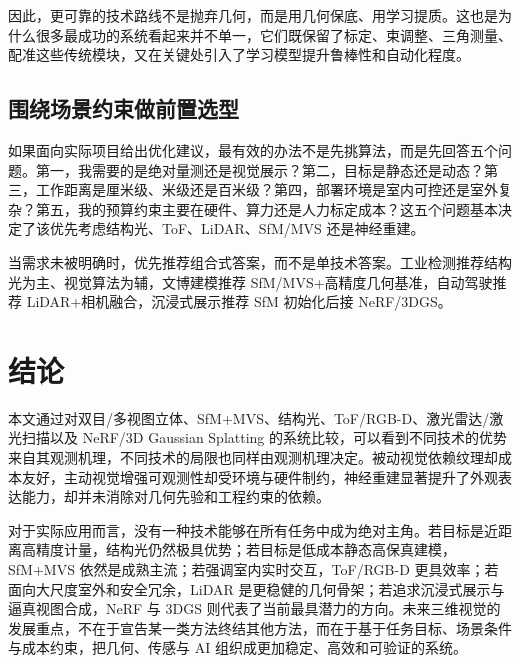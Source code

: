 \documentclass[12pt,a4paper]{ctexart}
\begin{document}
因此，更可靠的技术路线不是抛弃几何，而是用几何保底、用学习提质。这也是为什么很多最成功的系统看起来并不单一，它们既保留了标定、束调整、三角测量、配准这些传统模块，又在关键处引入了学习模型提升鲁棒性和自动化程度。

\subsection{围绕场景约束做前置选型}

如果面向实际项目给出优化建议，最有效的办法不是先挑算法，而是先回答五个问题。第一，我需要的是绝对量测还是视觉展示？第二，目标是静态还是动态？第三，工作距离是厘米级、米级还是百米级？第四，部署环境是室内可控还是室外复杂？第五，我的预算约束主要在硬件、算力还是人力标定成本？这五个问题基本决定了该优先考虑结构光、ToF、LiDAR、SfM/MVS 还是神经重建。

当需求未被明确时，优先推荐组合式答案，而不是单技术答案。工业检测推荐结构光为主、视觉算法为辅，文博建模推荐 SfM/MVS+高精度几何基准，自动驾驶推荐 LiDAR+相机融合，沉浸式展示推荐 SfM 初始化后接 NeRF/3DGS。
\section{结论}

本文通过对双目/多视图立体、SfM+MVS、结构光、ToF/RGB-D、激光雷达/激光扫描以及 NeRF/3D Gaussian Splatting 的系统比较，可以看到不同技术的优势来自其观测机理，不同技术的局限也同样由观测机理决定。被动视觉依赖纹理却成本友好，主动视觉增强可观测性却受环境与硬件制约，神经重建显著提升了外观表达能力，却并未消除对几何先验和工程约束的依赖。

对于实际应用而言，没有一种技术能够在所有任务中成为绝对主角。若目标是近距离高精度计量，结构光仍然极具优势；若目标是低成本静态高保真建模，SfM+MVS 依然是成熟主流；若强调室内实时交互，ToF/RGB-D 更具效率；若面向大尺度室外和安全冗余，LiDAR 是更稳健的几何骨架；若追求沉浸式展示与逼真视图合成，NeRF 与 3DGS 则代表了当前最具潜力的方向。未来三维视觉的发展重点，不在于宣告某一类方法终结其他方法，而在于基于任务目标、场景条件与成本约束，把几何、传感与 AI 组织成更加稳定、高效和可验证的系统。



\end{document}
